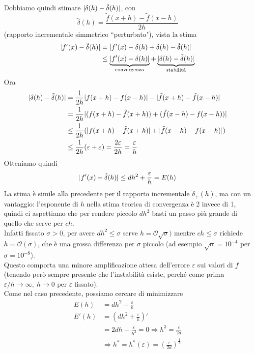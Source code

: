 \documentclass[12pt,a4paper]{article}
\DeclarePairedDelimiter{\abs}{\lvert}{\rvert}
\begin{document}
Dobbiamo quindi stimare $\abs{\delta(h) - \tilde{\delta}(h)}$, con
\[
\tilde{\delta}(h) = \frac{\tilde{f}(x+h) - \tilde{f}(x-h)}{2h}
\]
(rapporto incrementale simmetrico ``perturbato"), vista la stima
\[
\begin{split}
    \abs{f'(x) - \tilde{\delta}(h)} & = \abs{f'(x) - \delta(h) + \delta(h) - \tilde{\delta}(h)} \\
    & \le \underbrace{\abs{f'(x) - \delta(h)}}_{\text{convergenza}} + \underbrace{\abs{\delta(h) - \tilde{\delta}(h)}}_{\text{stabilità}}
\end{split}
\]
Ora
\[
\begin{split}
    \abs{\delta(h) - \tilde{\delta}(h)} & = \frac{1}{2h} \abs{f(x+h) - f(x-h)} - \abs{\tilde{f}(x+h) - \tilde{f}(x-h)} \\
    & = \frac{1}{2h} \abs{(f(x+h) - \tilde{f}(x+h)) + (\tilde{f}(x-h) - f(x-h))} \\
    & \le \frac{1}{2h} (\abs{f(x+h) - \tilde{f}(x+h)} + \abs{\tilde{f}(x-h) - f(x-h)}) \\
    & \le \frac{1}{2h} (\varepsilon + \varepsilon) = \frac{2 \varepsilon}{2h} = \frac{\varepsilon}{h}
\end{split}
\]
Otteniamo quindi
\[
\abs{f'(x) - \tilde{\delta}(h)} \le dh^2 + \frac{\varepsilon}{h} = E(h)
\]
La stima è simile alla precedente per il rapporto incrementale $\tilde{\delta}_+ (h)$, ma con un vantaggio: l'esponente di $h$ nella stima teorica di convergenza è 2
invece di 1, quindi ci aspettiamo che per rendere piccolo $dh^2$ basti un passo più grande di quello che serve per $ch$.\\
Infatti fissato $\sigma > 0$, per avere $dh^2 \le \sigma$ serve $h = \mathcal{O}\sqrt{\sigma})$ mentre $ch \le \sigma$ richiede $h = \mathcal{O}(\sigma)$, che è una grossa differenza per $\sigma$ piccolo (ad esempio $\sqrt{\sigma} = 10^{-4}$ per $\sigma = 10^{-8}$).\\
Questo comporta una minore amplificazione attesa dell'errore $\varepsilon$ sui valori di $f$ (tenendo
però sempre presente che l'instabilità esiste, perché come prima $\varepsilon/h \to \infty, \ h \to 0$ per $\varepsilon$ fissato).\\
Come nel caso precedente, possiamo cercare di minimizzare
\[
\begin{split}
E(h) & = dh^2 + \frac{\varepsilon}{h} \\
E'(h) & = (dh^2 + \frac{\varepsilon}{h})' \\
& = 2dh - \frac{\varepsilon}{h^2} = 0 \Rightarrow h^3 = \frac{\varepsilon}{2d} \\
& \Rightarrow h^* = h^* (\varepsilon) = (\frac{\varepsilon}{2d})^{\frac{1}{3}}
\end{split}
\]
\end{document}
